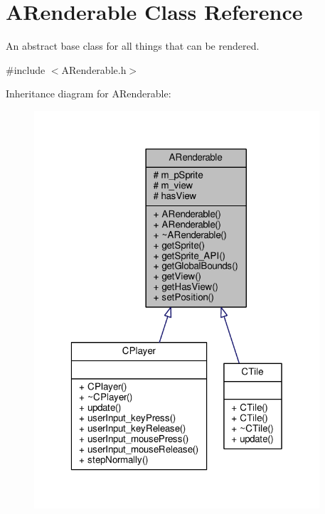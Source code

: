 \hypertarget{classARenderable}{\section{A\-Renderable Class Reference}
\label{classARenderable}
}


An abstract base class for all things that can be rendered.  




{\ttfamily \#include $<$A\-Renderable.\-h$>$}



Inheritance diagram for A\-Renderable\-:\nopagebreak
\begin{figure}[H]
\begin{center}
\leavevmode
\includegraphics[width=301pt]{classARenderable__inherit__graph}
\end{center}
\end{figure}


